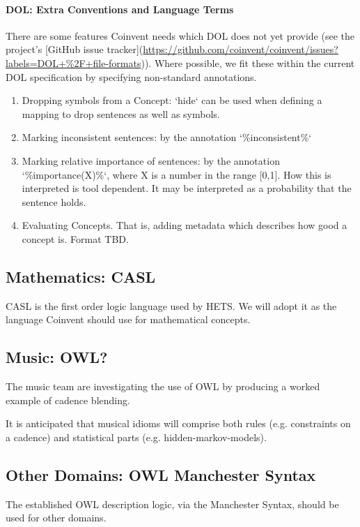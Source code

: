 \documentclass[10pt]{article}
\begin{document}
\paragraph{DOL: Extra Conventions and Language Terms}
There are some features Coinvent needs which DOL does not yet provide (see the project's [GitHub issue tracker](\url{https://github.com/coinvent/coinvent/issues?labels=DOL+\%2F+file-formats})). Where possible, we fit these within the current DOL specification by specifying non-standard annotations.
\begin{enumerate}
\item Dropping symbols from a Concept: `hide` can be used when defining a mapping to drop sentences as well as symbols.
\item Marking inconsistent sentences: by the annotation `\%inconsistent\%`
\item Marking relative importance of sentences: by the annotation `\%importance(X)\%`, where X is a number in the range [0,1]. How this is interpreted is tool dependent. It may be interpreted as a probability that the sentence holds.
\item Evaluating Concepts. That is, adding metadata which describes how good a concept is. Format TBD.
 \end{enumerate}
\subsection{Mathematics: CASL}

CASL is the first order logic language used by HETS. We will adopt it as the language Coinvent should use for mathematical concepts.

\subsection{Music: OWL?}

The music team are investigating the use of OWL by producing a worked example of cadence blending.

It is anticipated that musical idioms will comprise both rules (e.g. constraints on a cadence) and statistical parts 
(e.g. hidden-markov-models).

\subsection{Other Domains: OWL Manchester Syntax}

The established OWL description logic, via the Manchester Syntax, should be used for other domains.
\end{document}
